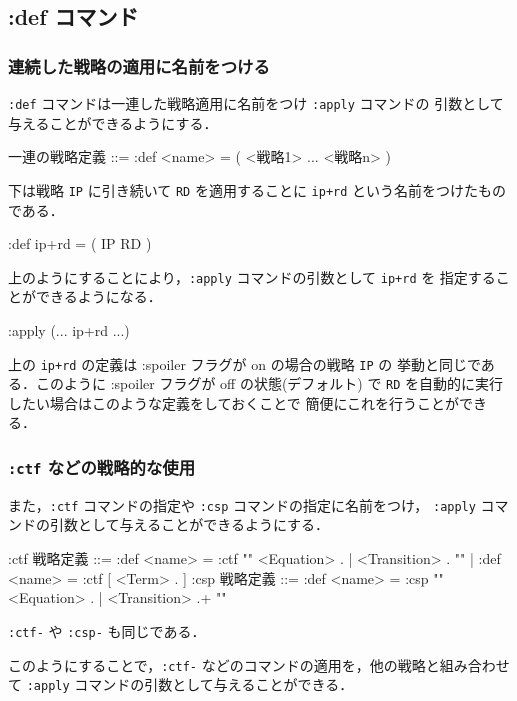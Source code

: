 \documentclass[a4paper,oneside,10pt,here]{memoir}
\newenvironment{vvtm}%
{\parskip=0pt\lineskip=0pt\begin{center}\begin{minipage}{0.8\textwidth}\begin{snugshade}}%
  {\end{snugshade}\end{minipage}\end{center}}
\begin{document}
\subsection{:def コマンド}\label{sec:def-command}
\subsubsection{連続した戦略の適用に名前をつける}
\texttt{:def} コマンドは一連した戦略適用に名前をつけ \texttt{:apply} コマンドの
引数として与えることができるようにする．
  \begin{vvtm}
    \begin{simplev}
    一連の戦略定義 ::= :def <name> = ( <戦略1> ... <戦略n> )
  \end{simplev}
  \end{vvtm}

下は戦略 \texttt{IP} に引き続いて \texttt{RD} を適用することに
\texttt{ip+rd} という名前をつけたものである．
\begin{examplev}
  :def ip+rd = ( IP RD )
\end{examplev}
上のようにすることにより，\texttt{:apply} コマンドの引数として \texttt{ip+rd} を
指定することができるようになる．
\begin{examplev}
  :apply (... ip+rd ...)
\end{examplev}
上の \texttt{ip+rd} の定義は :spoiler フラグが on の場合の戦略 \texttt{IP} の
挙動と同じである．このように :spoiler フラグが off の状態(デフォルト) で
\texttt{RD} を自動的に実行したい場合はこのような定義をしておくことで
簡便にこれを行うことができる．

\subsubsection{\texttt{:ctf} などの戦略的な使用}
また，\texttt{:ctf} コマンドの指定や \texttt{:csp} コマンドの指定に名前をつけ，
\texttt{:apply} コマンドの引数として与えることができるようにする．
  \begin{vvtm}
   \begin{simplev}
:ctf 戦略定義 ::= :def <name> = :ctf "{" { <Equation> . | <Transition> . } "}"
              |   :def <name> = :ctf [ <Term> . ]
:csp 戦略定義 ::= :def <name> = :csp "{" { <Equation> . | <Transition> .}+ "}"
  \end{simplev}
  \end{vvtm}
\texttt{:ctf-} や \texttt{:csp-} も同じである．

このようにすることで，\texttt{:ctf-} などのコマンドの適用を，他の戦略と組み合わせて
\texttt{:apply} コマンドの引数として与えることができる．
\end{document}
